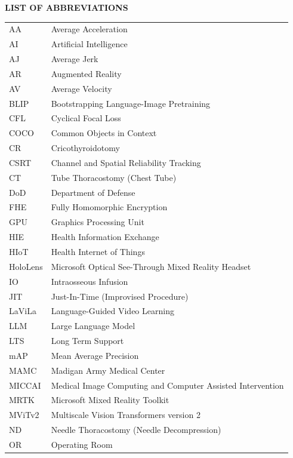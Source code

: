 \documentclass[12pt,a4paper]{report}
\begin{document}
\begin{center}
    {\fontsize{14pt}{17pt}\selectfont \textbf{LIST OF ABBREVIATIONS}\par}
\end{center}
\vspace{0.6cm}
\noindent
\begin{longtable}{@{}p{2.5cm} p{11.5cm}@{}}
AA & Average Acceleration \\
AI & Artificial Intelligence \\
AJ & Average Jerk \\
AR & Augmented Reality \\
AV & Average Velocity \\
BLIP & Bootstrapping Language-Image Pretraining \\
CFL & Cyclical Focal Loss \\
COCO & Common Objects in Context \\
CR & Cricothyroidotomy \\
CSRT & Channel and Spatial Reliability Tracking \\
CT & Tube Thoracostomy (Chest Tube) \\
DoD & Department of Defense \\
FHE & Fully Homomorphic Encryption \\
GPU & Graphics Processing Unit \\
HIE & Health Information Exchange \\
HIoT & Health Internet of Things \\
HoloLens & Microsoft Optical See-Through Mixed Reality Headset \\
IO & Intraosseous Infusion \\
JIT & Just-In-Time (Improvised Procedure) \\
LaViLa & Language-Guided Video Learning \\
LLM & Large Language Model \\
LTS & Long Term Support \\
mAP & Mean Average Precision \\
MAMC & Madigan Army Medical Center \\
MICCAI & Medical Image Computing and Computer Assisted Intervention \\
MRTK & Microsoft Mixed Reality Toolkit \\
MViTv2 & Multiscale Vision Transformers version 2 \\
ND & Needle Thoracostomy (Needle Decompression) \\
OR & Operating Room \\

\end{longtable}
\end{document}
